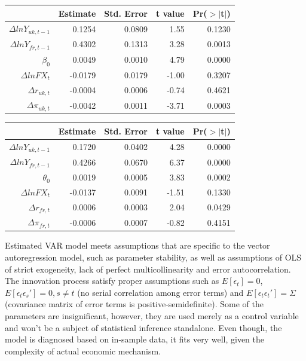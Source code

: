 \documentclass{article}
\begin{document}
\begin{table}[ht]
    \centering
    \begin{tabular}{rrrrr}
      \hline
     & Estimate & Std. Error & t value & Pr($>$$|$t$|$) \\ 
      \hline
    $\Delta ln Y_{uk, t-1}$ & 0.1254 & 0.0809 & 1.55 & 0.1230 \\ 
    $\Delta ln Y_{fr, t-1}$ & 0.4302 & 0.1313 & 3.28 & 0.0013 \\ 
      $\beta_0$ & 0.0049 & 0.0010 & 4.79 & 0.0000 \\ 
    $\Delta ln FX_t$ & -0.0179 & 0.0179 & -1.00 & 0.3207 \\ 
    $\Delta r_{uk, t}$ & -0.0004 & 0.0006 & -0.74 & 0.4621 \\ 
    $\Delta \pi_{uk, t}$ & -0.0042 & 0.0011 & -3.71 & 0.0003 \\ 
       \hline
    \end{tabular}
    \end{table}
    
    \begin{table}[ht]
    \centering
    \begin{tabular}{rrrrr}
      \hline
     & Estimate & Std. Error & t value & Pr($>$$|$t$|$) \\ 
      \hline
    $\Delta ln Y_{uk, t-1}$ & 0.1720 & 0.0402 & 4.28 & 0.0000 \\ 
    $\Delta ln Y_{fr, t-1}$ & 0.4266 & 0.0670 & 6.37 & 0.0000 \\ 
    $\theta_0$ & 0.0019 & 0.0005 & 3.83 & 0.0002 \\ 
    $\Delta ln FX_t$ & -0.0137 & 0.0091 & -1.51 & 0.1330 \\ 
    $\Delta r_{fr, t}$ & 0.0006 & 0.0003 & 2.04 & 0.0429 \\ 
    $\Delta \pi_{fr, t}$  & -0.0006 & 0.0007 & -0.82 & 0.4151 \\ 
       \hline
    \end{tabular}
    \end{table}


Estimated VAR model meets assumptions that are specific to the vector autoregression model, such as parameter stability, as well as assumptions of OLS of strict exogeneity, lack of perfect multicollinearity and error autocorrelation. The innovation process satisfy proper assumptions such as $E[\epsilon_t] = 0$, $E[\epsilon_t \epsilon_s '] = 0, s \neq t$ (no serial correlation among error terms) and $E[\epsilon_t \epsilon_t '] = \Sigma$ (covariance matrix of error terms is positive-semidefinite). Some of the parameters are insignificant, however, they are used merely as a control variable and won't be a subject of statistical inference standalone. Even though, the model is diagnosed based on in-sample data, it fits very well, given the complexity of actual economic mechanism. 
\end{document}
